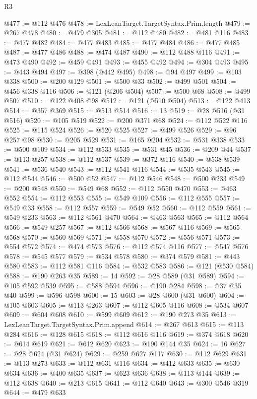 \begin{lexlean}{R3}
\begin{coremodule}
@477 := @112 @476
@478 := LexLeanTarget.TargetSyntax.Prim.length
@479 := @267 @478
@480 := @479 @305
@481 := @112 @480
@482 := @481 @116
@483 := @477 @482
@484 := @477 @483
@485 := @477 @484
@486 := @477 @485
@487 := @477 @486
@488 := @474 @487
@490 := @112 @488 @116
@491 := @473 @490
@492 := @459 @491
@493 := @455 @492
@494 := @304 @493
@495 := @443 @494
@497 := @398 (@442 @495)
@498 := @94 @497
@499 := @103 @338
@500 := @200 @129
@501 := @500 @33
@502 := @499 @501
@504 := @456 @338 @116
@506 := @121 (@206 @504)
@507 := @500 @68
@508 := @499 @507
@510 := @122 @408 @98
@512 := @121 (@510 @504)
@513 := @122 @413
@514 := @357 @369
@515 := @513 @514
@516 := 13
@519 := @28 @516 (@31 @516)
@520 := @105 @519
@522 := @200 @371 @68
@524 := @112 @522 @116
@525 := @115 @524
@526 := @520 @525
@527 := @499 @526
@529 := @96 @257 @98
@530 := @205 @529
@531 := @165 @204
@532 := @531 @338
@533 := @500 @109
@534 := @112 @533
@535 := @531 @45
@536 := @209 @44
@537 := @113 @257
@538 := @112 @537
@539 := @372 @116
@540 := @538 @539
@541 := @536 @540
@543 := @112 @541 @116
@544 := @535 @543
@545 := @112 @544
@546 := @500 @52
@547 := @112 @546
@548 := @500 @233
@549 := @200 @548
@550 := @549 @68
@552 := @112 @550 @470
@553 := @463 @552
@554 := @112 @553
@555 := @549 @109
@556 := @112 @555
@557 := @549 @33
@558 := @112 @557
@559 := @549 @52
@560 := @112 @559
@561 := @549 @233
@563 := @112 @561 @470
@564 := @463 @563
@565 := @112 @564
@566 := @549 @257
@567 := @112 @566
@568 := @567 @116
@569 := @565 @568
@570 := @560 @569
@571 := @558 @570
@572 := @556 @571
@573 := @554 @572
@574 := @474 @573
@576 := @112 @574 @116
@577 := @547 @576
@578 := @545 @577
@579 := @534 @578
@580 := @374 @579
@581 := @443 @580
@583 := @112 @581 @116
@584 := @532 @583
@586 := @121 (@530 @584)
@588 := @190 @263 @35
@589 := 14
@592 := @28 @589 (@31 @589)
@594 := @105 @592 @539
@595 := @588 @594
@596 := @190 @284
@598 := @37 @35 @40
@599 := @596 @598
@600 := 15
@603 := @28 @600 (@31 @600)
@604 := @105 @603
@605 := @113 @263
@607 := @112 @605 @116
@608 := @534 @607
@609 := @604 @608
@610 := @599 @609
@612 := @190 @273 @35
@613 := LexLeanTarget.TargetSyntax.Prim.append
@614 := @267 @613
@615 := @113 @284
@616 := @128 @615
@618 := @112 @616 @116
@619 := @374 @618
@620 := @614 @619
@621 := @612 @620
@623 := @190 @144 @35
@624 := 16
@627 := @28 @624 (@31 @624)
@629 := @259 @627 @117
@630 := @112 @629
@631 := @113 @273
@633 := @112 @631 @116
@634 := @412 @633
@635 := @630 @634
@636 := @400 @635
@637 := @623 @636
@638 := @113 @144
@639 := @112 @638
@640 := @213 @615
@641 := @112 @640
@643 := @300 @546 @319
@644 := @479 @633

\end{coremodule}
\end{lexlean}
